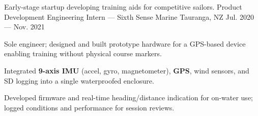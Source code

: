 \cventry%
    {Early-stage startup developing training aids for competitive sailors.}
    {Product Development Engineering Intern \textnormal{--- Sixth Sense Marine}}
    {Tauranga, NZ}
    {Jul. 2020 --- Nov. 2021}
    {
      \begin{cvitems}
        \item {Sole engineer; designed and built prototype hardware for a GPS-based device enabling training without physical course markers.}
        \item {Integrated \textbf{9-axis IMU} (accel, gyro, magnetometer), \textbf{GPS}, wind sensors, and SD logging into a single waterproofed enclosure.}
        \item {Developed firmware and real-time heading/distance indication for on-water use; logged conditions and performance for session reviews.}
      \end{cvitems}
    }
